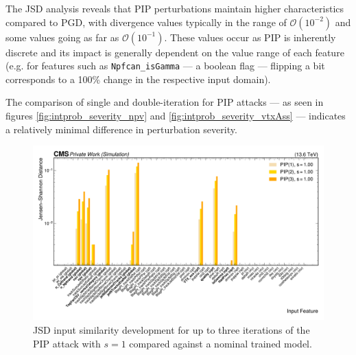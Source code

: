 The JSD analysis reveals that PIP perturbations maintain higher characteristics compared to PGD, with divergence values typically in the range of $\mathcal{O}(10^{-2})$ and some values going as far as $\mathcal{O}(10^{-1})$. These values occur as PIP is inherently discrete and its impact is generally dependent on the value range of each feature (e.g. for features such as \texttt{Npfcan\_isGamma} — a boolean flag — flipping a bit corresponds to a 100\% change in the respective input domain).

The comparison of single and double-iteration for PIP attacks — as seen in figures \ref{fig:intprob_severity_npv} and \ref{fig:intprob_severity_vtxAss} — indicates a relatively minimal difference in perturbation severity.

\begin{figure}[h]
\centering
    \includegraphics[width=15cm]{media/output/features/compare/jsd_intprob_per_feature.pdf}
    \caption{JSD input similarity development for up to three iterations of the PIP attack with $s=1$ compared against a nominal trained model.}
    \label{fig:intprob_joint_overview}
\end{figure}

